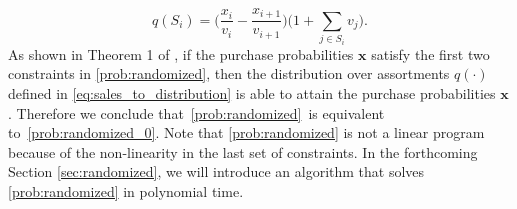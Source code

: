 \documentclass[mnsc,non-blindrev]{informs3}
\theoremstyle{definition}
\begin{document}
\begin{equation}\label{eq:sales_to_distribution}
q(S_i)=\Big(\dfrac{x_i}{v_i}-\dfrac{x_{i+1}}{v_{i+1}}\Big)\Big(1+\sum_{j\in S_i}v_j\Big).
\end{equation}
As shown in Theorem 1 of \cite{topaloglu2013joint}, if the purchase probabilities $\bm{x}$ satisfy the first two constraints in \ref{prob:randomized}, then the distribution over assortments $q(\cdot)$ defined in \eqref{eq:sales_to_distribution} is able to attain the purchase probabilities $\bm{x}$. Therefore we conclude that~\ref{prob:randomized}~is equivalent to~\ref{prob:randomized_0}. Note that \ref{prob:randomized} is not a linear program because of the non-linearity in the last set of constraints. In the forthcoming Section \ref{sec:randomized}, we will introduce an algorithm that solves \ref{prob:randomized} in polynomial time.
\end{document}
